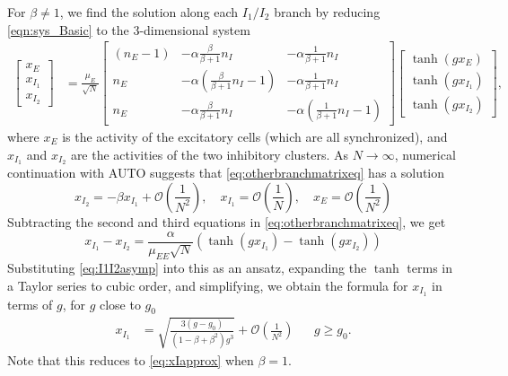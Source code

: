 \documentclass[11pt,reqno]{amsart}
\begin{document}
For $\beta \neq 1$, we find the solution along each $I_1/I_2$ branch by reducing \cref{eqn:sys_Basic} to the 3-dimensional system
\begin{equation}\label{eq:otherbranchmatrixeq}
 \begin{aligned}
 \begin{bmatrix} x_E\\x_{I_1}\\x_{I_2}\end{bmatrix} 
 &= \frac{\mu_E}{\sqrt{N}} 
 \begin{bmatrix} (n_E - 1) & -\alpha \frac{\beta}{\beta+1} n_I & - \alpha \frac{1}{\beta+1} n_I  \\
 n_E  & -\alpha \left(\frac{\beta}{\beta+1} n_I-1\right) & - \alpha \frac{1}{\beta+1} n_I  \\
 n_E  & -\alpha \frac{\beta}{\beta+1} n_I & -\alpha \left(\frac{1}{\beta+1} n_I-1\right)
 \end{bmatrix}
 \begin{bmatrix} \tanh(g x_E) \\\tanh ( g x_{I_1} ) \\\tanh(g x_{I_2})\end{bmatrix},
 \end{aligned}
 \end{equation}
 where $x_E$ is the activity of the excitatory cells (which are all synchronized), and $x_{I_1}$ and $x_{I_2}$ are the activities of the two inhibitory clusters. As $N \rightarrow \infty$, numerical continuation with AUTO suggests that \cref{eq:otherbranchmatrixeq} has a solution
\begin{equation}\label{eq:I1I2asymp}
    x_{I_2} = -\beta x_{I_1} + \mathcal{O}\left( \frac{1}{N^2} \right), \quad 
    x_{I_1} = \mathcal{O}\left( \frac{1}{N} \right), \quad
     x_E = \mathcal{O}\left( \frac{1}{N^2} \right)
\end{equation}
Subtracting the second and third equations in \cref{eq:otherbranchmatrixeq}, we get
\[
 x_{I_1} - x_{I_2} = \frac{\alpha}{\mu_{EE}\sqrt{N}}\left( \tanh(g x_{I_1}) - \tanh(g x_{I_2}) \right)
 \]
Substituting \cref{eq:I1I2asymp} into this as an ansatz, expanding the $\tanh$ terms in a Taylor series to cubic order, and simplifying, we obtain the formula for $x_{I_1}$ in terms of $g$, for $g$ close to $g_0$
 \begin{align}\label{eq:XI1}
 x_{I_1} &= \sqrt{ \frac{ 3(g - g_0) }{ (1 - \beta + \beta^2 )g^3}} + \mathcal{O}\left( \frac{1}{N^2}\right)&& g \geq g_0.
\end{align}
Note that this reduces to \cref{eq:xIapprox} when $\beta = 1$.
\end{document}
